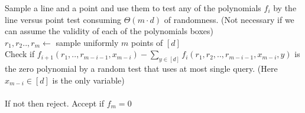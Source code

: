 \documentclass{article}
\begin{document}
\begin{algorithm}[H]
  Sample a line and a point and use them to test any of the polynomials $f_{i}$ by the line versus point test consuming $\Theta\left( m\cdot d \right)$ of randomness.  (Not necessary if we can assume the validity of each of the polynomials boxes) \\  
    $r_{1}, r_{2} .., r_{m} \leftarrow$ sample uniformly  $m$ points of $[d]$ \\
     {
      Check if $f_{i+1}\left( r_{1} , .., r_{m-i-1}, x_{m-i} \right) - \sum_{y \in [d]}{f_{i} \left( r_{1}, r_{2}, .., r_{m-i-1},x_{m-i}, y \right)} $ is the zero polynomial by a random test that uses at most single query. (Here $x_{m-i} \in [d]$ is the only variable)  \\
      \ \\
      If not then reject.  
    }
    Accept if $f_{m} = 0 $  
\end{algorithm}
\end{document}
